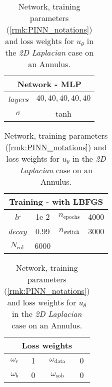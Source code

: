 \begin{table}[htbp]
    \centering
    \begin{tabular}{cc}
        \toprule
        \multicolumn{2}{c}{\textbf{Network - MLP}} \\
        \midrule
        \textit{layers} & $40,40,40,40,40$ \\
        \cmidrule(lr){1-2}
        $\sigma$ & tanh \\
        \bottomrule
    \end{tabular}
    \hspace{1cm}
    \begin{tabular}{cccc}
        \toprule
        \multicolumn{4}{c}{\textbf{Training - with LBFGS}} \\
        \midrule
        \textit{lr} & 1e-2 & $n_\text{epochs}$ & 4000 \\
        \cmidrule(lr){1-2} \cmidrule(lr){3-4}
        \textit{decay} & 0.99 & $n_\text{switch}$ & 3000 \\
        \cmidrule(lr){1-2} \cmidrule(lr){3-4}
        $N_\text{col}$ & 6000 \\
        \bottomrule
    \end{tabular}
    \hspace{1cm}
    \begin{tabular}{cccc}
        \toprule
        \multicolumn{4}{c}{\textbf{Loss weights}} \\
        \midrule
        $\omega_r$ & 1 & $\omega_\text{data}$ & 0 \\
        \cmidrule(lr){1-2} \cmidrule(lr){3-4}
        $\omega_b$ & 0 & $\omega_\text{sob}$ & 0 \\        
        \bottomrule
    \end{tabular}
    \caption{Network, training parameters (\cref{rmk:PINN_notations}) and loss weights for $u_\theta$ in the \textit{2D Laplacian} case on an Annulus.}
    \label{tab:paramtest5_2D}
\end{table}
